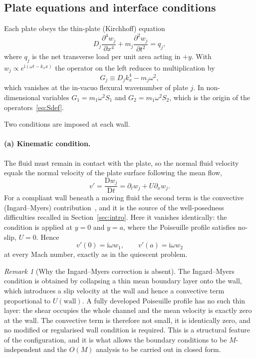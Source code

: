 \documentclass[11pt,a4paper]{article}
\newcommand{\ii}{\mathrm{i}}
\theoremstyle{plain}
\theoremstyle{remark}
\newtheorem{remark}[theorem]{Remark}
\begin{document}
\subsection{Plate equations and interface conditions}
Each plate obeys the thin-plate (Kirchhoff) equation
\begin{equation}
D_j\frac{\partial^4w_j}{\partial x^4}+m_j\frac{\partial^2w_j}{\partial t^2}=q_j ,
\label{eq:plateeq}
\end{equation}
where $q_j$ is the net transverse load per unit area acting in $+y$. With $w_j\propto
e^{\ii(\omega t-k_xx)}$ the operator on the left reduces to multiplication by
\begin{equation}
G_j\equiv D_jk_x^4-m_j\omega^2 ,
\label{eq:Gdef}
\end{equation}
which vanishes at the in-vacuo flexural wavenumber of plate $j$. In non-dimensional variables
$G_1=m_1\omega^2S_1$ and $G_2=m_1\omega^2S_2$, which is the origin of the operators~\eqref{eq:Sdef}.

Two conditions are imposed at each wall.

\paragraph{(a) Kinematic condition.} The fluid must remain in contact with the plate, so the normal
fluid velocity equals the normal velocity of the plate surface following the mean flow,
\begin{equation}
v'=\frac{\mathrm{D}w_j}{\mathrm{D}t}=\partial_tw_j+U\partial_xw_j .
\label{eq:kinematic}
\end{equation}
For a compliant wall beneath a moving fluid the second term is the convective (Ingard--Myers)
contribution~\cite{ingard,myers}, and it is the source of the well-posedness difficulties recalled in
Section~\ref{sec:intro}. Here it vanishes identically: the condition is applied at $y=0$ and $y=a$,
where the Poiseuille profile satisfies no-slip, $U=0$. Hence
\begin{equation}
v'(0)=\ii\omega w_1,\qquad v'(a)=\ii\omega w_2
\label{eq:kin2}
\end{equation}
at every Mach number, exactly as in the quiescent problem.

\begin{remark}[Why the Ingard--Myers correction is absent]\label{rem:IM}
The Ingard--Myers condition is obtained by collapsing a thin mean boundary layer onto the wall, which
introduces a slip velocity at the wall and hence a convective term proportional to $U(\text{wall})$.
A fully developed Poiseuille profile has no such thin layer: the shear occupies the whole channel and
the mean velocity is exactly zero at the wall. The convective term is therefore not small, it is
identically zero, and no modified or regularised wall condition is required. This is a structural
feature of the configuration, and it is what allows the boundary conditions to be $M$-independent and
the $O(M)$ analysis to be carried out in closed form.
\end{remark}
\end{document}

